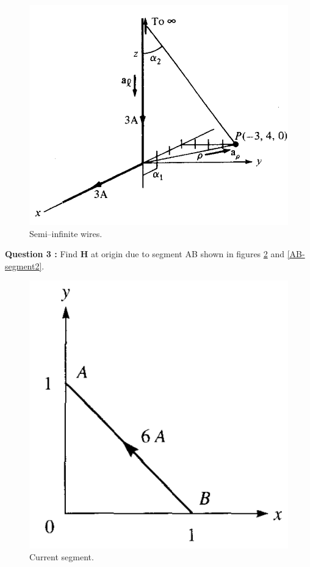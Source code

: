 \documentclass[12pt,a4paper]{article}
\begin{document}
\begin{figure}[H]
\centering
\includegraphics[scale=0.45]{Figure7-7aS.png}
\caption{Semi--infinite wires.}
\label{Semi-infinite-wires}
\end{figure}
\noindent\textbf{Question 3 \cite[Problem 7.3 and 7.4, page 297]{Sadiku}:} Find \textbf{H} at origin due to segment AB shown in figures \ref{AB-segment1} and \ref{AB-segment2}.\\
\begin{figure}[H]
\centering
\includegraphics[scale=0.4]{Figure7-26S.png}
\caption{Current segment.}
\label{AB-segment1}
\end{figure}
\end{document}
